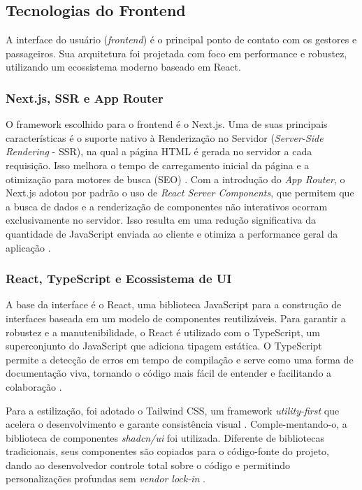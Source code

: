 \subsection{Tecnologias do Frontend}

A interface do usuário (\textit{frontend}) é o principal ponto de contato com os gestores e passageiros. Sua arquitetura foi projetada com foco em performance e robustez, utilizando um ecossistema moderno baseado em React.

\subsubsection{Next.js, SSR e App Router}
O framework escolhido para o frontend é o Next.js. Uma de suas principais características é o suporte nativo à Renderização no Servidor (\textit{Server-Side Rendering} - SSR), na qual a página HTML é gerada no servidor a cada requisição. Isso melhora o tempo de carregamento inicial da página e a otimização para motores de busca (SEO) \cite{medium2025ssr}. Com a introdução do \textit{App Router}, o Next.js adotou por padrão o uso de \textit{React Server Components}, que permitem que a busca de dados e a renderização de componentes não interativos ocorram exclusivamente no servidor. Isso resulta em uma redução significativa da quantidade de JavaScript enviada ao cliente e otimiza a performance geral da aplicação \cite{nextjs2025servercomponents}.

\subsubsection{React, TypeScript e Ecossistema de UI}
A base da interface é o React, uma biblioteca JavaScript para a construção de interfaces baseada em um modelo de componentes reutilizáveis. Para garantir a robustez e a manutenibilidade, o React é utilizado com o TypeScript, um superconjunto do JavaScript que adiciona tipagem estática. O TypeScript permite a detecção de erros em tempo de compilação e serve como uma forma de documentação viva, tornando o código mais fácil de entender e facilitando a colaboração \cite{dhiwise2024reacttypescript}.

Para a estilização, foi adotado o Tailwind CSS, um framework \textit{utility-first} que acelera o desenvolvimento e garante consistência visual \cite{medium2025cssframeworks}. Comple-mentando-o, a biblioteca de componentes \textit{shadcn/ui} foi utilizada. Diferente de bibliotecas tradicionais, seus componentes são copiados para o código-fonte do projeto, dando ao desenvolvedor controle total sobre o código e permitindo personalizações profundas sem \textit{vendor lock-in} \cite{shadcnui2025docs}.


